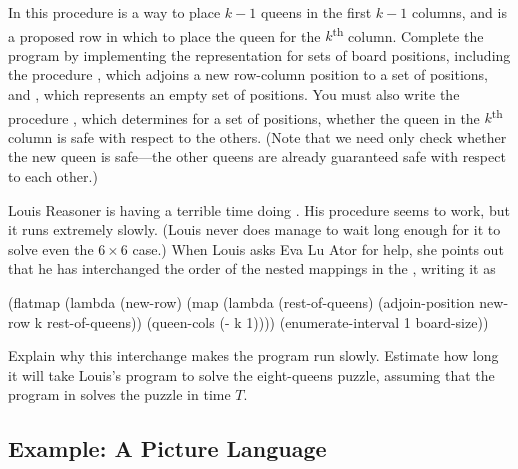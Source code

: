 \begin{exercise}
	In this procedure  is a way to place \( k - 1 \) queens in the first \( k - 1 \) columns, and  is a proposed row in which to place the queen for the \( k \)\textsuperscript{th} column.
	Complete the program by implementing the representation for sets of board positions, including the procedure , which adjoins a new row-column position to a set of positions, and , which represents an empty set of positions.
	You must also write the procedure , which determines for a set of positions, whether the queen in the \( k \)\textsuperscript{th} column is safe with respect to the others.
	(Note that we need only check whether the new queen is safe---the other queens are already guaranteed safe with respect to each other.)
\end{exercise}



\begin{exercise}
	\label{Exercise 2.43}
	Louis Reasoner is having a terrible time doing .
	His  procedure seems to work, but it runs extremely slowly.
	(Louis never does manage to wait long enough for it to solve even the \( 6 × 6 \) case.)
	When Louis asks Eva Lu Ator for help, she points out that he has interchanged the order of the nested mappings in the , writing it as
	\begin{scheme}
	  (flatmap
	   (lambda (new-row)
	     (map (lambda (rest-of-queens)
	            (adjoin-position new-row k rest-of-queens))
	          (queen-cols (- k 1))))
	   (enumerate-interval 1 board-size))
	\end{scheme}
	Explain why this interchange makes the program run slowly.
	Estimate how long it will take Louis’s program to solve the eight-queens puzzle, assuming that the program in  solves the puzzle in time \( T \).
\end{exercise}



\subsection{Example: A Picture Language}
\label{Section 2.2.4}


